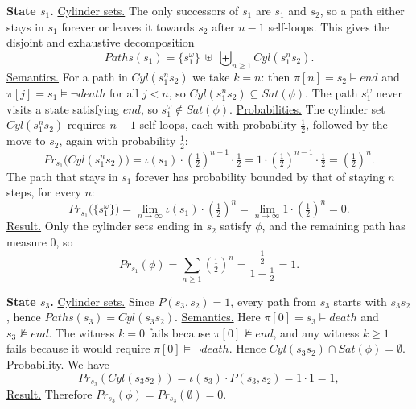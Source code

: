 \documentclass[12pt,a4paper]{article}
\begin{document}
\begin{description}
\medskip
\noindent\textbf{State $s_1$.}
\underline{Cylinder sets.} The only successors of $s_1$ are $s_1$ and $s_2$, so a path either stays in $s_1$ forever or leaves it towards $s_2$ after $n-1$ self-loops. This gives the disjoint and exhaustive decomposition
\[
Paths(s_1)=\{s_1^\omega\}\ \uplus\ \biguplus_{n\ge1}Cyl(s_1^ns_2).
\]
\underline{Semantics.} For a path in $Cyl(s_1^ns_2)$ we take $k=n$: then $\pi[n]=s_2\vDash end$ and $\pi[j]=s_1\vDash\lnot death$ for all $j<n$, so $Cyl(s_1^ns_2)\subseteq Sat(\phi)$. The path $s_1^\omega$ never visits a state satisfying $end$, so $s_1^\omega\notin Sat(\phi)$.
\underline{Probabilities.} The cylinder set $Cyl(s_1^ns_2)$ requires $n-1$ self-loops, each with probability $\tfrac12$, followed by the move to $s_2$, again with probability $\tfrac12$:
\[
Pr_{s_1}\big(Cyl(s_1^ns_2)\big)=\iota(s_1)\cdot\left(\tfrac12\right)^{n-1}\cdot\tfrac12=1\cdot\left(\tfrac12\right)^{n-1}\cdot\tfrac12=\left(\tfrac12\right)^{n}.
\]
The path that stays in $s_1$ forever has probability bounded by that of staying $n$ steps, for every $n$:
\[
Pr_{s_1}\big(\{s_1^\omega\}\big)=\lim_{n\to\infty}\iota(s_1)\cdot\left(\tfrac12\right)^{n}=\lim_{n\to\infty}1\cdot\left(\tfrac12\right)^{n}=0 .
\]
\underline{Result.} Only the cylinder sets ending in $s_2$ satisfy $\phi$, and the remaining path has measure $0$, so
\[
Pr_{s_1}(\phi)=\sum_{n\ge1}\left(\tfrac12\right)^{n}=\frac{\tfrac12}{1-\tfrac12}=1 .
\]

\medskip
\noindent\textbf{State $s_3$.}
\underline{Cylinder sets.} Since $P(s_3,s_2)=1$, every path from $s_3$ starts with $s_3s_2$, hence $Paths(s_3)=Cyl(s_3s_2)$.
\underline{Semantics.} Here $\pi[0]=s_3\vDash death$ and $s_3\nvDash end$. The witness $k=0$ fails because $\pi[0]\nvDash end$, and any witness $k\ge1$ fails because it would require $\pi[0]\vDash\lnot death$. Hence $Cyl(s_3s_2)\cap Sat(\phi)=\emptyset$.
\underline{Probability.} We have
\[
Pr_{s_3}(Cyl(s_3s_2))=\iota(s_3)\cdot P(s_3,s_2)=1\cdot1=1,
\]
\underline{Result.} Therefore $Pr_{s_3}(\phi)=Pr_{s_3}(\emptyset)=0$.


\end{description}
\end{document}
